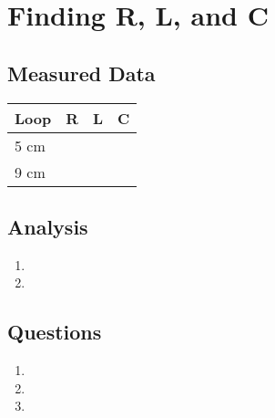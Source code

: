 \documentclass{article}
\begin{document}
\section{Finding R, L, and C}

\subsection{Measured Data}
\begin{table}[H]
\centering
\begin{tabular}{|l|l|l|l|}
\hline
Loop & R & L & C \\ \hline
5 cm &   &   &  \\ \hline
9 cm &   &   &  \\ \hline
\end{tabular}
\end{table}

\subsection{Analysis}

\begin{enumerate}
	\item
	\item
\end{enumerate}

\subsection{Questions}

\begin{enumerate}
	\item 
	\item 
	\item 
\end{enumerate}

\end{document}
